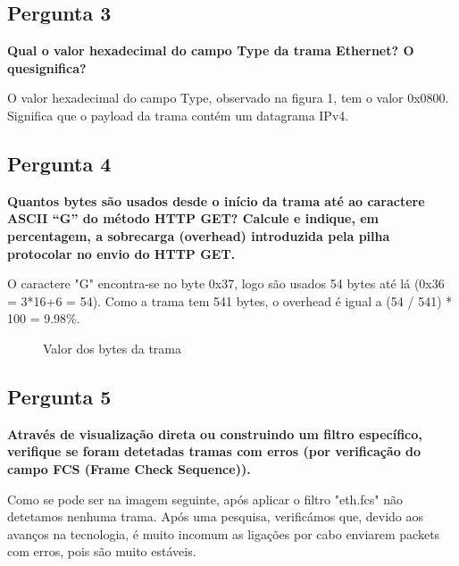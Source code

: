 \documentclass[11pt]{article}
\begin{document}
\subsection{Pergunta 3}

\textbf{Qual o valor hexadecimal do campo Type da trama Ethernet? O quesignifica?}

O valor hexadecimal do campo Type, observado na figura 1, tem o valor 0x0800. Significa que o payload da trama contém um datagrama IPv4.

\subsection{Pergunta 4}

\textbf{Quantos bytes são usados desde o início da trama até ao caractere ASCII “G” do método HTTP GET? Calcule e indique, em percentagem, a sobrecarga (overhead) introduzida pela pilha protocolar no envio do HTTP GET.}

O caractere "G" encontra-se no byte 0x37, logo são usados 54 bytes até lá (0x36 = 3*16+6 = 54). Como a trama tem 541 bytes, o overhead é igual a (54 / 541) * 100 = 9.98\%.

\begin{figure}[hbt!]
    \centering
    \caption{Valor dos bytes da trama}
\end{figure}
\clearpage
\subsection{Pergunta 5}

\textbf{Através de visualização direta ou construindo um filtro específico, verifique se foram detetadas tramas com erros (por verificação do campo FCS (Frame Check Sequence)).}

Como se pode ser na imagem seguinte, após aplicar o filtro "eth.fcs" não detetamos nenhuma trama. Após uma pesquisa, verificámos que, devido aos avanços na tecnologia, é muito incomum as ligações por cabo enviarem packets com erros, pois são muito estáveis.
\end{document}
